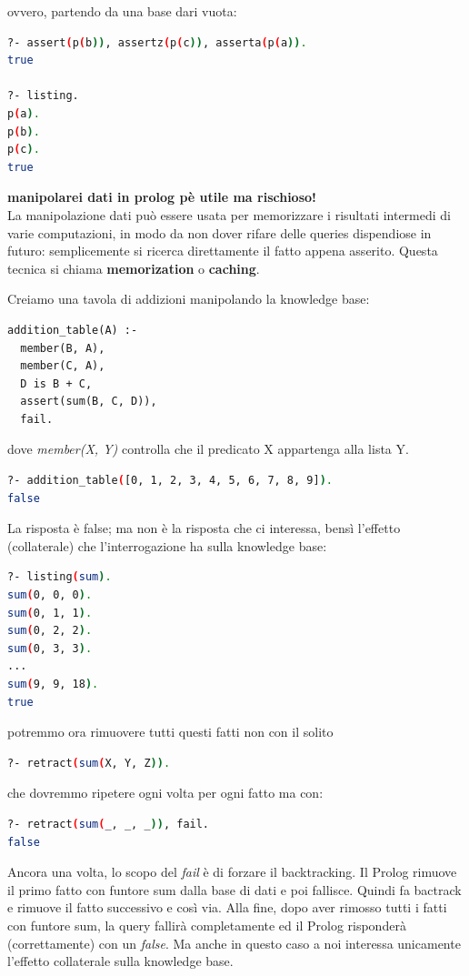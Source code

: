 \documentclass[a4paper,12pt, oneside]{book}
\begin{document}
ovvero, partendo da una base dari vuota:
\begin{shaded}
\begin{lstlisting}[language=bash]
?- assert(p(b)), assertz(p(c)), asserta(p(a)).
true

?- listing.
p(a).
p(b).
p(c).
true
\end{lstlisting}
\end{shaded}
\textbf{manipolarei dati in prolog pè utile ma rischioso!}\\
La manipolazione dati può essere usata per memorizzare i risultati
intermedi di varie computazioni, in modo da non dover rifare
delle queries dispendiose in futuro: semplicemente si ricerca
direttamente il fatto appena asserito. Questa tecnica si chiama \textbf{memorization} o \textbf{caching}.
\begin{esempio}
Creiamo una tavola di addizioni manipolando la knowledge base:
\begin{verbatim}
addition_table(A) :-
  member(B, A),
  member(C, A),
  D is B + C,
  assert(sum(B, C, D)),
  fail.
\end{verbatim}
dove \textit{member(X, Y)} controlla che il predicato X appartenga alla lista Y.\\
\begin{shaded}
\begin{lstlisting}[language=bash]
?- addition_table([0, 1, 2, 3, 4, 5, 6, 7, 8, 9]).
false
\end{lstlisting}
\end{shaded}
La risposta è false; ma non è la risposta che ci interessa, bensì
l’effetto (collaterale) che l’interrogazione ha sulla knowledge base:
\begin{shaded}
\begin{lstlisting}[language=bash]
?- listing(sum).
sum(0, 0, 0).
sum(0, 1, 1).
sum(0, 2, 2).
sum(0, 3, 3).
...
sum(9, 9, 18).
true
\end{lstlisting}
\end{shaded}
potremmo ora rimuovere tutti questi fatti non con il solito 
\begin{shaded}
\begin{lstlisting}[language=bash]
?- retract(sum(X, Y, Z)).
\end{lstlisting}
\end{shaded}
che dovremmo ripetere ogni volta per ogni fatto ma con:
\begin{shaded}
\begin{lstlisting}[language=bash]
?- retract(sum(_, _, _)), fail.
false
\end{lstlisting}
\end{shaded}
Ancora una volta, lo scopo del \textit{fail} è di forzare il backtracking. Il Prolog rimuove il primo fatto con funtore sum dalla base di dati e poi fallisce. Quindi fa bactrack e rimuove il fatto successivo e così via. Alla fine, dopo aver rimosso tutti i fatti con funtore sum, la query fallirà completamente ed il Prolog risponderà (correttamente) con un \textit{false}. Ma anche in questo caso a noi interessa unicamente l’effetto collaterale sulla knowledge base.
\end{esempio}
\end{document}
